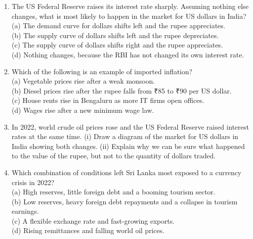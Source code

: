 \begin{enumerate}[resume, leftmargin=1.6em, label=\arabic*., itemsep=3pt]
\item The US Federal Reserve raises its interest rate sharply. Assuming nothing else changes, what is most likely to happen in the market for US dollars in India?\\
(a) The demand curve for dollars shifts left and the rupee appreciates.\\
(b) The supply curve of dollars shifts left and the rupee depreciates.\\
(c) The supply curve of dollars shifts right and the rupee appreciates.\\
(d) Nothing changes, because the RBI has not changed its own interest rate.
\item Which of the following is an example of imported inflation?\\
(a) Vegetable prices rise after a weak monsoon.\\
(b) Diesel prices rise after the rupee falls from ₹85 to ₹90 per US dollar.\\
(c) House rents rise in Bengaluru as more IT firms open offices.\\
(d) Wages rise after a new minimum wage law.
\item In 2022, world crude oil prices rose and the US Federal Reserve raised interest rates at the same time. (i) Draw a diagram of the market for US dollars in India showing both changes. (ii) Explain why we can be sure what happened to the value of the rupee, but not to the quantity of dollars traded.
\item Which combination of conditions left Sri Lanka most exposed to a currency crisis in 2022?\\
(a) High reserves, little foreign debt and a booming tourism sector.\\
(b) Low reserves, heavy foreign debt repayments and a collapse in tourism earnings.\\
(c) A flexible exchange rate and fast-growing exports.\\
(d) Rising remittances and falling world oil prices.
\end{enumerate}
\endgroup
